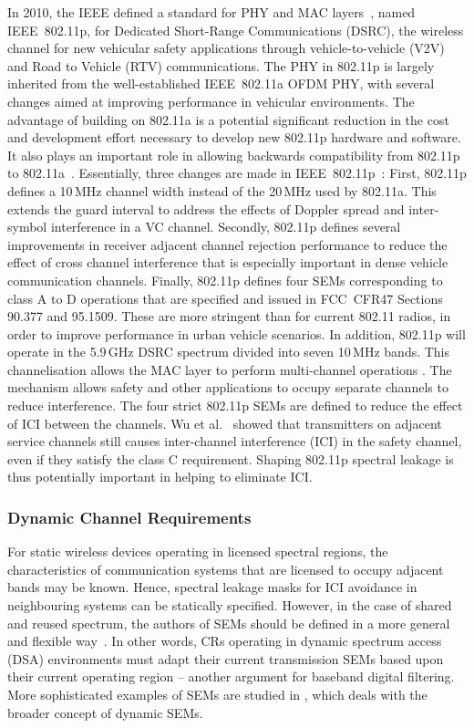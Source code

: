 In 2010, the IEEE defined a standard for PHY and MAC layers~\cite{802-11p2010}, named IEEE~802.11p, for Dedicated Short-Range Communications (DSRC), the wireless channel for new vehicular safety applications through vehicle-to-vehicle (V2V) and Road to Vehicle (RTV) communications.
The PHY in 802.11p is largely inherited from the well-established IEEE~802.11a OFDM PHY, with several changes aimed at improving performance in vehicular environments.
The advantage of building on 802.11a is a potential significant reduction in the cost and development effort necessary to develop new 802.11p hardware and software.
It also plays an important role in allowing backwards compatibility from 802.11p to 802.11a~\cite{Vandenberghe2011,Fernandez2012}.
Essentially, three changes are made in IEEE~802.11p~\cite{Jiang2008}:
First, 802.11p defines a 10\,MHz channel width instead of the 20\,MHz used by 802.11a.
This extends the guard interval to address the effects of Doppler spread and inter-symbol interference in a VC channel.
Secondly, 802.11p defines several improvements in receiver adjacent channel rejection performance to reduce the effect of cross channel interference that is especially important in dense vehicle communication channels.
Finally, 802.11p defines four SEMs corresponding to class A to D operations that are specified and issued in FCC~CFR47 Sections 90.377 and 95.1509.
These are more stringent than for current 802.11 radios, in order to improve performance in urban vehicle scenarios.
In addition, 802.11p will operate in the 5.9\,GHz DSRC spectrum divided into seven 10\,MHz bands.
This channelisation allows the MAC layer to perform multi-channel operations \cite{WAVE2010}.
The mechanism allows safety and other applications to occupy separate channels to reduce interference.
The four strict 802.11p SEMs are defined to reduce the effect of ICI between the channels. %
Wu et al.~\cite{Wu2013} showed that transmitters on adjacent service channels still causes inter-channel interference (ICI) in the safety channel, even if they satisfy the class C requirement.
Shaping 802.11p spectral leakage is thus potentially important in helping to eliminate ICI.

\subsubsection{Dynamic Channel Requirements}
For static wireless devices operating in licensed spectral regions, the characteristics of communication systems that are licensed to occupy adjacent bands may be known.
Hence, spectral leakage masks for ICI avoidance in neighbouring systems can be statically specified.
However, in the case of shared and reused spectrum, the authors of SEMs should be defined in a more general and flexible way~\cite{Macaluso2014}.
In other words, CRs operating in dynamic spectrum access (DSA) environments must adapt their current transmission SEMs based upon their current operating region -- another argument for baseband digital filtering.
More sophisticated examples of SEMs are studied in \cite{Forde2010}, which deals with the broader concept of dynamic SEMs.

